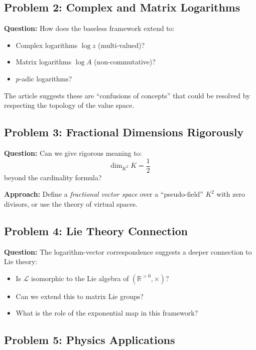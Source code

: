 \documentclass[11pt]{article}
\begin{document}
\subsection{Problem 2: Complex and Matrix Logarithms}
\label{prob:complex}

\textbf{Question:} How does the baseless framework extend to:
\begin{itemize}
\item Complex logarithms $\log z$ (multi-valued)?
\item Matrix logarithms $\log A$ (non-commutative)?
\item $p$-adic logarithms?
\end{itemize}

The article suggests these are ``confusions of concepts'' that could be resolved by respecting the topology of the value space.

\subsection{Problem 3: Fractional Dimensions Rigorously}
\label{prob:fractional}

\textbf{Question:} Can we give rigorous meaning to:
\[
\dim_{K^2} K = \frac{1}{2}
\]
beyond the cardinality formula?

\textbf{Approach:} Define a \emph{fractional vector space} over a ``pseudo-field'' $K^2$ with zero divisors, or use the theory of virtual spaces.

\subsection{Problem 4: Lie Theory Connection}
\label{prob:lie}

\textbf{Question:} The logarithm-vector correspondence suggests a deeper connection to Lie theory:
\begin{itemize}
\item Is $\mathcal{L}$ isomorphic to the Lie algebra of $(\mathbb{R}^{>0}, \times)$?
\item Can we extend this to matrix Lie groups?
\item What is the role of the exponential map in this framework?
\end{itemize}

\subsection{Problem 5: Physics Applications}
\label{prob:physics}
\end{document}
